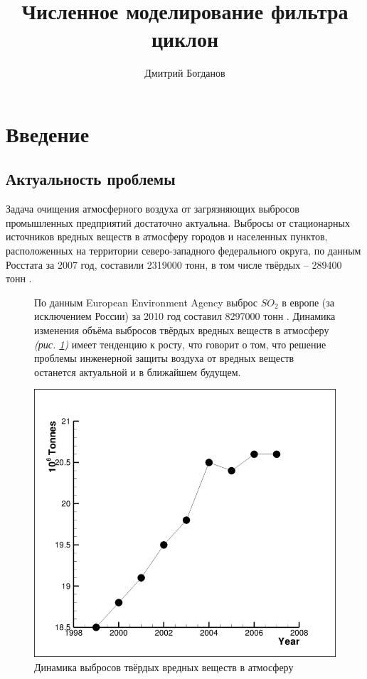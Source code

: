 \documentclass[pdftex,a4paper,12pt]{article}
\title{Численное моделирование фильтра циклон}
\author{Дмитрий Богданов}
\date{}
\begin{document}

\tableofcontents
\newpage
\section{Введение}
\subsection{Актуальность проблемы}
	\hspace{2em} 	Задача очищения атмосферного воздуха от загрязняющих выбросов промышленных предприятий достаточно актуальна. Выбросы от стационарных источников вредных веществ в атмосферу городов и населенных пунктов, расположенных на территории северо-западного федерального округа,  по данным Росстата за 2007 год,  составили 2319000 тонн, в том числе твёрдых -- 289400 тонн \cite{emissionInfoRussian}.
	\begin{figure}[ht]
		\vspace{-1em}
		\begin{minipage}[b]{0.48\linewidth}
		По данным European Environment Agency выброс $SO_2$ в европе (за исключением России) за 2010 год составил 8297000 тонн \cite{emissionInfoEurope}.
			Динамика изменения объёма выбросов твёрдых вредных веществ в атмосферу \textit{(рис. \ref{figure:atmosphereDynamic})} имеет тенденцию к росту, что говорит о том, что решение проблемы инженерной защиты воздуха от вредных веществ останется актуальной и в ближайшем будущем. 
		\end{minipage}
		\hspace{0.04\linewidth}
		\begin{minipage}[b]{0.48\linewidth}
			\centering
			\includegraphics[scale=0.2]{atmosphereDynamic}
			\caption{Динамика выбросов твёрдых вредных веществ в атмосферу \cite{emissionInfoRussian}}
			\label{figure:atmosphereDynamic}
		\end{minipage}
	\end{figure}
	\vspace{-1em}
	
\end{document}
